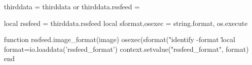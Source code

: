 \startluacode
  thirddata = thirddata or {}
  thirddata.rssfeed = {}

  local rssfeed = thirddata.rssfeed
  local sformat,osexec = string.format, os.execute

  function rssfeed.image_format(image) 
    osexec(sformat("identify -format \"%
    local format=io.loaddata('rssfeed_format')
    context.setvalue("rssfeed_format", format)
  end
\stopluacode

\protect
\stopmodule
